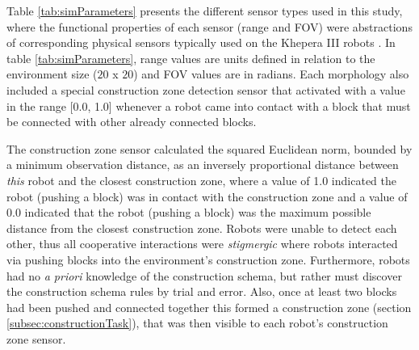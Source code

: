 \documentclass[conference]{IEEEtran}
\begin{document}
Table \ref{tab:simParameters} presents the different sensor types used in this study, where the functional properties of each sensor
(range and FOV) were abstractions of corresponding physical sensors typically used on the Khepera III robots \cite{khepera3usermanual2013}.
In table \ref{tab:simParameters}, range values are units defined in relation to the environment size ($20$ x $20$)
and FOV values are in radians.
Each morphology also included a special construction zone detection sensor that activated with a value in the range
[0.0, 1.0] whenever a robot came into
contact with a block that must be connected with other already connected blocks.

The construction zone sensor calculated the squared Euclidean norm, bounded by a minimum observation distance, as an
inversely proportional distance between \textit{this} robot and the closest construction zone, where a value of 1.0 indicated the robot (pushing a block)
was in contact with the construction zone and a value of 0.0 indicated that the robot (pushing a block) was the maximum possible
distance from the closest construction zone.
Robots were unable to detect each other, thus all cooperative interactions were \textit{stigmergic} \cite{BeckersHollandDeneubourg1994}
where robots interacted via pushing blocks into the environment's construction zone.
Furthermore, robots had no \textit{a priori} knowledge of the construction schema,
but rather must discover the construction schema rules by trial and error.
Also, once at least two blocks had been pushed and connected together this formed a construction zone (section \ref{subsec:constructionTask}),
that was then visible to each robot's construction zone sensor.
\end{document}
